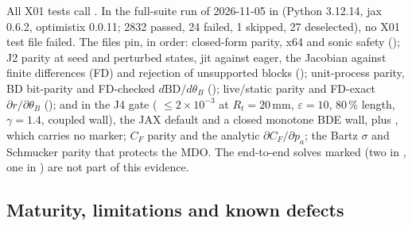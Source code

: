 All X01 tests call . In the full-suite run of 2026-11-05 in  (Python 3.12.14, jax 0.6.2, optimistix 0.0.11; 2832 passed, 24 failed, 1 skipped, 27 deselected), no X01 test file failed. The files pin, in order: closed-form parity, x64 and sonic safety (); J2 parity at seed and perturbed states, jit against eager, the Jacobian against finite differences (FD) and rejection of unsupported blocks (); unit-process parity, BD bit-parity and FD-checked $d\text{BD}/d\theta_B$ (); live/static parity and FD-exact $\partial r/\partial\theta_B$ (); and in  the J4 gate ( $\le2\times10^{-3}$ at $R_t=20$\,mm, $\varepsilon=10$, 80\,\% length, $\gamma=1.4$, coupled wall), the JAX default and a closed monotone BDE wall, plus , which carries no  marker;  $C_F$ parity and the analytic $\partial C_F/\partial p_a$;  the Bartz $\sigma$ and Schmucker parity that protects the MDO. The end-to-end solves marked  (two in , one in ) are not part of this evidence.

\subsection{Maturity, limitations and known defects}

